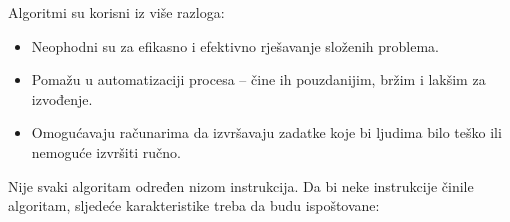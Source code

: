 Algoritmi su korisni iz više razloga:
\begin{itemize}
	\item   Neophodni su za efikasno i efektivno rješavanje složenih problema.
	
	\item  Pomažu u automatizaciji procesa -- čine ih pouzdanijim, bržim i lakšim za izvođenje.
	
	\item  Omogućavaju računarima da izvršavaju zadatke koje bi ljudima bilo teško ili nemoguće izvršiti ručno.
	
\end{itemize}
Nije svaki algoritam određen nizom instrukcija. Da bi neke instrukcije činile algoritam, sljedeće karakteristike treba da budu ispoštovane:

